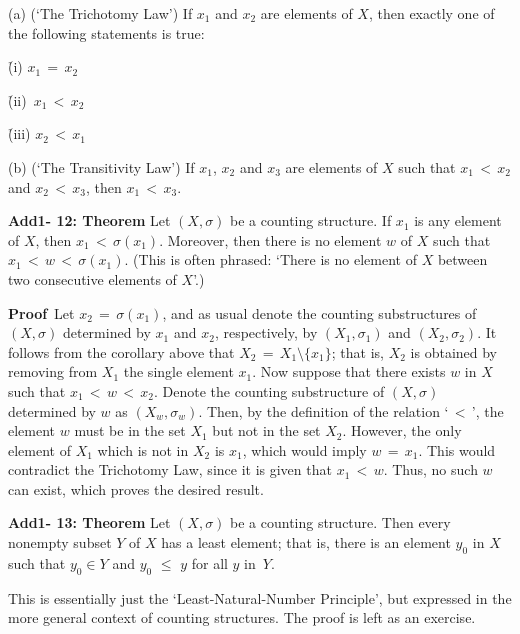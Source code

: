 {\V

        (a) (`The Trichotomy Law') If $x_{1}$ and $x_{2}$ are elements of $X$, then exactly one of the following statements is true:

        \h (i)\,\,$x_{1} \,=\, x_{2}$

        \h (ii)\, $x_{1}\,<\,x_{2}$

        \h (iii) $x_{2}\,<\,x_{1}$

\V

        (b) (`The Transitivity Law') If $x_{1}$, $x_{2}$ and $x_{3}$ are elements of $X$ such that $x_{1}\,<\,x_{2}$ and $x_{2}\,<\,x_{3}$, then $x_{1}\,<\,x_{3}$.

\V
\V


        {\bf Add1- 12: Theorem} Let $(X,{\sigma})$ be a counting structure. If $x_{1}$ is any element of $X$, then $x_{1}\,<\,{\sigma}(x_{1})$.
    Moreover, then there is no element $w$ of $X$ such that $x_{1}\,<\,w\,<\,{\sigma}(x_{1})$.
    (This is often phrased: `There is no element of $X$ between two consecutive elements of $X$'.)

\V

        {\bf Proof}\,  Let $x_{2} \,=\, {\sigma}(x_{1})$, and as usual denote the counting substructures of $(X,{\sigma})$ determined by $x_{1}$ and $x_{2}$, respectively, by $(X_{1},{\sigma}_{1})$ and $(X_{2},{\sigma}_{2})$.
    It follows from the corollary above that $X_{2} \,=\, X_{1}{\setminus}\{x_{1}\}$; that is, $X_{2}$ is obtained by removing from $X_{1}$ the single element $x_{1}$.
    Now suppose that there exists $w$ in $X$ such that $x_{1}\,<\,w\,<\,x_{2}$.
    Denote the counting substructure of $(X,{\sigma})$ determined by $w$ as $(X_{w},{\sigma}_{w})$.
    Then, by the definition of the relation `$\,<\,$', the element $w$ must be in the set $X_{1}$ but not in the set $X_{2}$.
    However, the only element of $X_{1}$ which is not in $X_{2}$ is $x_{1}$, which would imply $w \,=\, x_{1}$.
    This would contradict the Trichotomy Law, since it is given that $x_{1}\,<\,w$.
    Thus, no such $w$ can exist, which proves the desired result.

\V


        {\bf Add1- 13: Theorem} Let $(X,{\sigma})$ be a counting structure. Then every nonempty subset $Y$ of $X$ has a least element;
    that is, there is an element $y_{0}$ in $X$ such that $y_{0}{\in}Y$ and $y_{0}\,\,{\leq}\,\,y$ for all $y$ in~$Y$.

\V

        This is essentially just the `Least-Natural-Number Principle',
    but expressed in the more general context of counting structures.
    The proof is left as an exercise.

}
